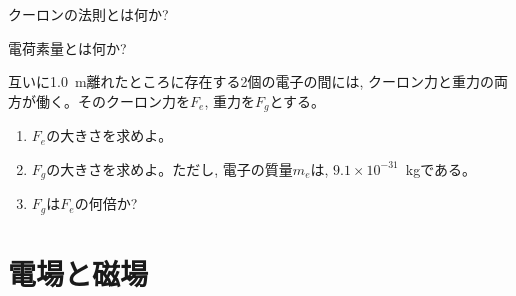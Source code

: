 \begin{q}\label{q:coulomb_law}
クーロンの法則とは何か?
\end{q}

\begin{q}\label{q:element_charge}
電荷素量とは何か?
\end{q}

\begin{q}\label{q:elec_grav_compare}
互いに1.0~m離れたところに存在する2個の電子の間には, 
クーロン力と重力の両方が働く。そのクーロン力を$F_e$, 重力を$F_g$とする。
\begin{enumerate}
\item $F_e$の大きさを求めよ。
\item $F_g$の大きさを求めよ。ただし, 電子の質量$m_e$は, $9.1\times10^{-31}$~kgである。
\item $F_g$は$F_e$の何倍か?
\end{enumerate}
\end{q}\mv


\section{電場と磁場}

